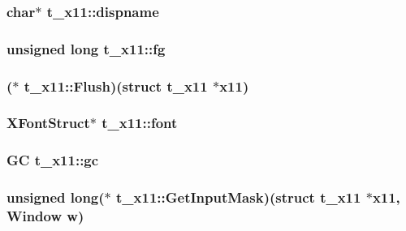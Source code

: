 \hypertarget{structt__x11_a1fad3cfb76707aaa695fd0e160b67962}{
\subsubsection[{dispname}]{\setlength{\rightskip}{0pt plus 5cm}char$\ast$ {\bf t\-\_\-x11\-::dispname}}}\label{structt__x11_a1fad3cfb76707aaa695fd0e160b67962}
\hypertarget{structt__x11_ad2abe20e3e164fa1ed9832dae3926993}{
\subsubsection[{fg}]{\setlength{\rightskip}{0pt plus 5cm}unsigned long {\bf t\-\_\-x11\-::fg}}}\label{structt__x11_ad2abe20e3e164fa1ed9832dae3926993}
\hypertarget{structt__x11_af00975965aac02bf818fb2a91f3c9c63}{
\subsubsection[{\-Flush}]{($\ast$ {\bf t\-\_\-x11\-::\-Flush})(struct {\bf t\-\_\-x11} $\ast$x11)}}\label{structt__x11_af00975965aac02bf818fb2a91f3c9c63}
\hypertarget{structt__x11_a96e2df6c6351c642bff62d9c45e83339}{
\subsubsection[{font}]{\setlength{\rightskip}{0pt plus 5cm}\-X\-Font\-Struct$\ast$ {\bf t\-\_\-x11\-::font}}}\label{structt__x11_a96e2df6c6351c642bff62d9c45e83339}
\hypertarget{structt__x11_afc9837841aa94e27b363e943018af040}{
\subsubsection[{gc}]{\setlength{\rightskip}{0pt plus 5cm}\-G\-C {\bf t\-\_\-x11\-::gc}}}\label{structt__x11_afc9837841aa94e27b363e943018af040}
\hypertarget{structt__x11_a826befb42be3889dc30ee560e3bca54b}{
\subsubsection[{\-Get\-Input\-Mask}]{\setlength{\rightskip}{0pt plus 5cm}unsigned long($\ast$ {\bf t\-\_\-x11\-::\-Get\-Input\-Mask})(struct {\bf t\-\_\-x11} $\ast$x11, \-Window {\bf w})}}\label{structt__x11_a826befb42be3889dc30ee560e3bca54b}
